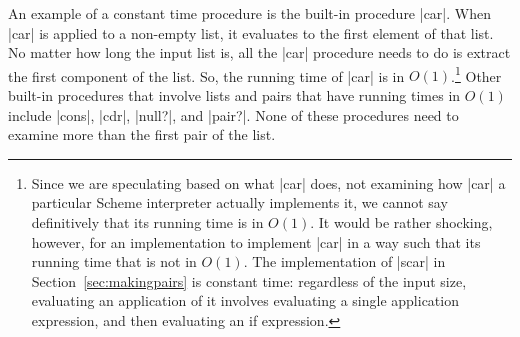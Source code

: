 \begin{schemeregion}
An example of a constant time procedure is the built-in procedure \scheme|car|.  When \scheme|car| is applied to a non-empty list, it evaluates to the first element of that list.  No matter how long the input list is, all the \scheme|car| procedure needs to do is extract the first component of the list.  So, the running time of \scheme|car| is in $O(1)$.\footnote{Since we are speculating based on what \scheme|car| does, not examining how \scheme|car| a particular Scheme interpreter actually implements it, we cannot say definitively that its running time is in $O(1)$.  It would be rather shocking, however, for an implementation to implement \scheme|car| in a way such that its running time that is not in $O(1)$. The implementation of \scheme|scar| in Section~\ref{sec:makingpairs} is constant time: regardless of the input size, evaluating an application of it involves evaluating a single application expression, and then evaluating an if expression.}  Other built-in procedures that involve lists and pairs that have running times in $O(1)$ include \scheme|cons|, \scheme|cdr|, \scheme|null?|, and \scheme|pair?|.  None of these procedures need to examine more than the first pair of the list.




%


\end{schemeregion}
